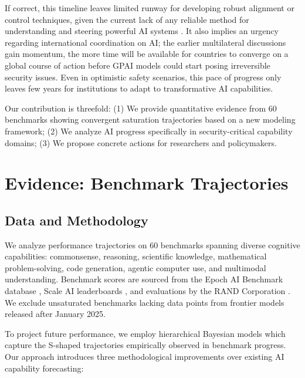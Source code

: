 \documentclass[letterpaper,twocolumn]{article}
\begin{document}
If correct, this timeline leaves limited runway for developing robust alignment or control techniques, given the current lack of any reliable method for understanding and steering powerful AI systems \citep{casper_open_2023, bengio_international_2025, maier_take_2025, ngo_alignment_2025}. It also implies an urgency regarding international coordination on AI; the earlier multilateral discussions gain momentum, the more time will be available for countries to converge on a global course of action before GPAI models could start posing irreversible security issues. Even in optimistic safety scenarios, this pace of progress only leaves few years for institutions to adapt to transformative AI capabilities.

Our contribution is threefold:
(1) We provide quantitative evidence from 60 benchmarks showing convergent saturation trajectories based on a new modeling framework;
(2) We analyze AI progress specifically in security-critical capability domains;
(3) We propose concrete actions for researchers and policymakers.

\section{Evidence: Benchmark Trajectories}
\label{sec:evidence}

\subsection{Data and Methodology}
\label{subsec:methodology}

We analyze performance trajectories on 60 benchmarks spanning diverse cognitive capabilities: commonsense, reasoning, scientific knowledge, mathematical problem-solving, code generation, agentic computer use, and multimodal understanding.
Benchmark scores are sourced from the Epoch AI Benchmark database \citep{epoch_ai_ai_2024}, Scale AI leaderboards \citep{scale_ai_introducing_2025}, and evaluations by the RAND Corporation \citep{dev_toward_2025}. We exclude unsaturated benchmarks lacking data points from frontier models released after January 2025.

To project future performance, we employ hierarchical Bayesian models which capture the S-shaped trajectories empirically observed in benchmark progress. Our approach introduces three methodological improvements over existing AI capability forecasting:
\end{document}
